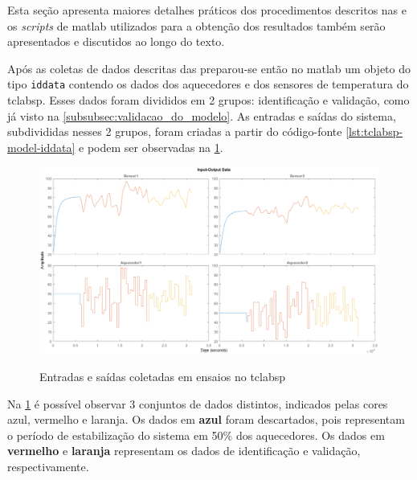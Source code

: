 Esta seção apresenta maiores detalhes práticos dos procedimentos descritos nas 
 e os
\textit{scripts} de \acrshort{matlab} utilizados para a obtenção dos resultados também serão
apresentados e discutidos ao longo do texto.

Após as coletas de dados descritas das
preparou-se então no \acrshort{matlab} um objeto do tipo \texttt{iddata} contendo os dados dos aquecedores
e dos sensores de temperatura do \acrshort{tclabsp}.
Esses dados foram divididos em 2 grupos: identificação e validação, como já visto na \cref{subsubsec:validacao_do_modelo}.
As entradas e saídas do sistema, subdivididas nesses 2 grupos, foram criadas a partir do código-fonte
\ref{lst:tclabsp-model-iddata} e podem ser observadas na \cref{fig:tclabsp-model-IOs}.

\begin{figure}[h]
	\caption{Entradas e saídas coletadas em ensaios no \acrshort{tclabsp}}
	\begin{center}
		\includegraphics[width=1.00\textwidth]{./5_images/tclabsp-model-IOs.png} 
		\label{fig:tclabsp-model-IOs}
	\end{center}
	\centering
\end{figure}

Na \cref{fig:tclabsp-model-IOs} é possível observar 3 conjuntos de dados distintos, indicados pelas cores 
azul, vermelho e laranja. Os dados em \textbf{azul} foram descartados, pois representam o período de 
estabilização do sistema em 50\% dos aquecedores. Os dados em \textbf{vermelho} e \textbf{laranja} representam
os dados de identificação e validação, respectivamente.


